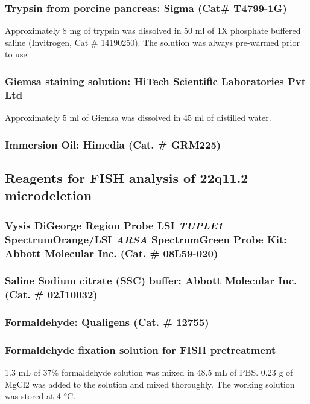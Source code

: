 \begin{refsection}
\subsubsection{Trypsin from porcine pancreas: \textmd{ Sigma (Cat\# T4799-1G)}} 
Approximately 8 mg of trypsin was dissolved in 50 ml of 1X phosphate buffered saline (Invitrogen, Cat \# 14190250). The solution was always pre-warmed prior to use. 
\subsubsection{Giemsa staining solution: \textmd{HiTech Scientific Laboratories Pvt Ltd}}
Approximately 5 ml of Giemsa was dissolved in 45 ml of distilled water.
\subsubsection{Immersion Oil: \textmd{Himedia (Cat. \# GRM225)}}

\subsection{Reagents for FISH analysis of 22q11.2 microdeletion}
\subsubsection{Vysis DiGeorge Region Probe LSI \textit{TUPLE1} SpectrumOrange/LSI \textit{ARSA} SpectrumGreen Probe Kit: \textmd{Abbott Molecular Inc. (Cat. \# 08L59-020)}}
\begin{sloppypar}\subsubsection{Saline Sodium citrate (SSC) buffer: \textmd{Abbott Molecular Inc. (Cat. \# 02J10032)}}\end{sloppypar}

\subsubsection{Formaldehyde: \textmd{Qualigens (Cat. \# 12755)}}


\subsubsection{Formaldehyde fixation solution for FISH pretreatment}
1.3 mL of 37\% formaldehyde solution was mixed in 48.5 mL of PBS. 0.23 g of MgCl2 was added to the solution and mixed thoroughly. The working solution was stored at 4 °C.


\end{refsection}
